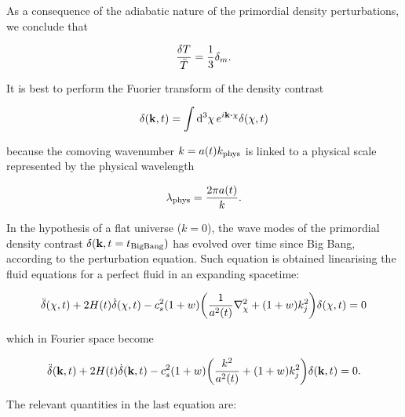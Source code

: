 As a consequence of the adiabatic nature of the primordial density
perturbations, we conclude that

\begin{equation}
        \frac{\var{T}}{\bar T} = \frac{1}{3} \delta_m.
\end{equation}

It is best to perform the Fuorier transform of the density contrast

\begin{equation}
        \delta \qty(\vb{k},t) = \int \dd[3]{\vb{\chi}} e^{i\vb{k} \vdot
        \vb{\chi}} \delta\qty(\vb{\chi},t)
\end{equation}

because the comoving wavenumber $k = a\qty(t) k_\text{phys}$ is linked to a
physical scale represented by the physical wavelength

\begin{equation}
        \lambda_\text{phys} = \frac{2\pi a\qty(t)}{k}.
\end{equation}

In the hypothesis  of a flat universe ($k = 0$), the wave modes of the
primordial density contrast $\delta\qty(\vb{k},t = t_\text{BigBang})$
has evolved over time since Big Bang, according to the perturbation
equation. Such equation is obtained linearising the fluid equations
for a perfect fluid in an expanding spacetime:

\begin{equation}
        \ddot \delta\qty(\vb{\chi},t) + 2H\qty(t)\dot \delta\qty(\vb{\chi},t) -
        c_s^2\qty(1 + w)\qty(\frac{1}{a^2\qty(t)} \laplacian_\chi + \qty(
        1 + w)k^2_j)
        \delta\qty(\vb{\chi},t) = 0
\end{equation}

which in Fourier space become

\begin{equation}
        \ddot \delta\qty(\vb{k},t) + 2H\qty(t)\dot \delta\qty(\vb{k},t) -
        c_s^2\qty(1 + w)\qty(\frac{k^2}{a^2\qty(t)} + \qty(1 + w)k^2_j)
        \delta\qty(\vb{k},t) = 0.
        \label{eq:perturbations_density}
\end{equation}

The relevant quantities in the last equation are:

